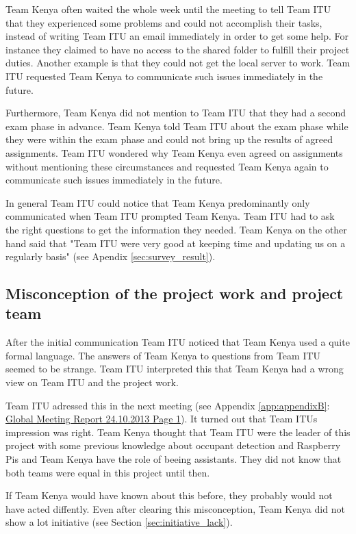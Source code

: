 Team Kenya often waited the whole week until the meeting to tell Team ITU that they experienced some problems and could not accomplish their tasks, instead of writing Team ITU an email immediately in order to get some help. For instance they claimed to have no access to the shared folder to fulfill their project duties. Another example is that they could not get the local server to work. Team ITU requested Team Kenya to communicate such issues immediately in the future.

Furthermore, Team Kenya did not mention to Team ITU that they had a second exam phase in advance. Team Kenya told Team ITU about the exam phase while they were within the exam phase and could not bring up the results of agreed assignments. Team ITU wondered why Team Kenya even agreed on assignments without mentioning these circumstances and requested Team Kenya again to communicate such issues immediately in the future.

In general Team ITU could notice that Team Kenya predominantly only communicated when Team ITU prompted Team Kenya. Team ITU had to ask the right questions to get the information they needed.
Team Kenya on the other hand said that "Team ITU were very good at keeping time and updating us on a regularly basis" (see Apendix \ref{sec:survey_result}).


\subsection{Misconception of the project work and project team}
\label{sec:misconception}
After the initial communication Team ITU noticed that Team Kenya used a quite formal language. The answers of Team Kenya to questions from Team ITU seemed to be strange. Team ITU interpreted this that Team Kenya had a wrong view on Team ITU and the project work.

Team ITU adressed this in the next meeting (see Appendix \ref{app:appendixB}: \hyperlink{GSD20131024.1}{Global Meeting Report 24.10.2013 Page 1}). It turned out that Team ITUs impression was right. Team Kenya thought that Team ITU were the leader of this project with some previous knowledge about occupant detection and Raspberry Pis and Team Kenya have the role of beeing assistants. They did not know that both teams were equal in this project until then.

If Team Kenya would have known about this before, they probably would not have acted diffently. Even after clearing this misconception, Team Kenya did not show a lot initiative (see Section \ref{sec:initiative_lack}).

